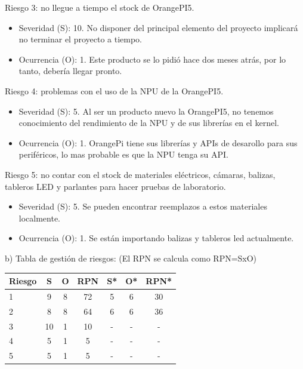 \documentclass[
11pt, %
]{charter}
\begin{document}
Riesgo 3: no llegue a tiempo el stock de OrangePI5.
\begin{itemize}
	\item Severidad (S): 10. No disponer del principal elemento del proyecto implicará no terminar el proyecto a tiempo.
	\item Ocurrencia (O): 1. Este producto se lo pidió hace dos meses atrás, por lo tanto, debería llegar pronto.
\end{itemize}

Riesgo 4: problemas con el uso de la NPU de la OrangePI5.
\begin{itemize}
	\item Severidad (S): 5. Al ser un producto nuevo la OrangePI5, no tenemos conocimiento del rendimiento de la NPU y de sus librerías en el kernel.
	\item Ocurrencia (O): 1. OrangePi tiene sus librerías y APIs de desarollo para sus periféricos, lo mas probable es que la NPU tenga su API.
\end{itemize}

Riesgo 5: no contar con el stock de materiales eléctricos, cámaras, balizas, tableros LED y parlantes para hacer pruebas de laboratorio.
\begin{itemize}
	\item Severidad (S): 5. Se pueden encontrar reemplazos a estos materiales localmente.
	\item Ocurrencia (O): 1. Se están importando balizas y tableros led actualmente.
\end{itemize}

b) Tabla de gestión de riesgos:      (El RPN se calcula como RPN=SxO)

\begin{table}[htpb]
\centering
\begin{tabularx}{\linewidth}{@{}|X|c|c|c|c|c|c|@{}}
\hline
\rowcolor[HTML]{C0C0C0} 
Riesgo & S & O & RPN & S* & O* & RPN* \\ \hline
1    & 9  & 8  &  72   &  5  & 6   &  30    \\ \hline
2    &  8 & 8  &  64  &   6 &   6 &   36   \\ \hline
3    & 10 & 1  &  10   & -   &  -  & -     \\ \hline
4    &  5 & 1  &   5  &   - &  -  &    -  \\ \hline
5    &  5 & 1  &   5  &   - &  -  &    -  \\ \hline
\end{tabularx}%
\end{table}
\end{document}
